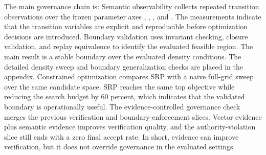 {}\markdownRendererSectionBegin
{}\markdownRendererInterblockSeparator
{}The main governance chain is:\markdownRendererInterblockSeparator
{}\markdownRendererInterblockSeparator
{}Semantic observability collects repeated transition observations over the frozen parameter axes , , , and . The measurements indicate that the transition variables are explicit and reproducible before optimization decisions are introduced.\markdownRendererParagraphSeparator
{}Boundary validation uses invariant checking, closure validation, and replay equivalence to identify the evaluated feasible region. The main result is a stable boundary over the evaluated density conditions. The detailed density sweep and boundary generalization checks are placed in the appendix.\markdownRendererParagraphSeparator
{}Constrained optimization compares SRP with a naive full-grid sweep over the same candidate space. SRP reaches the same top objective while reducing the search budget by 60 percent, which indicates that the validated boundary is operationally useful.\markdownRendererParagraphSeparator
{}The evidence-controlled governance check merges the previous verification and boundary-enforcement slices. Vector evidence plus semantic evidence improves verification quality, and the authority-violation slice still ends with a zero final accept rate. In short, evidence can improve verification, but it does not override governance in the evaluated settings.\markdownRendererParagraphSeparator
